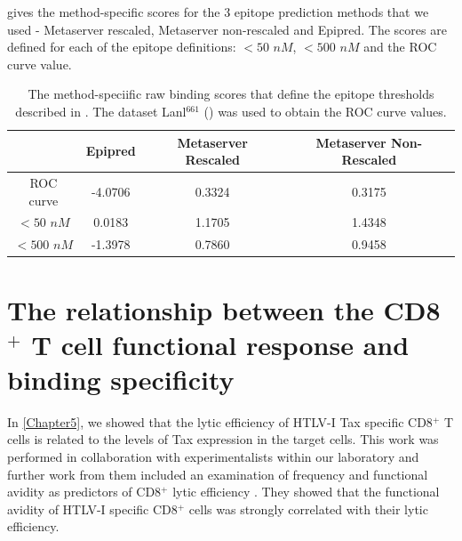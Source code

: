  gives the method-specific scores for the 3 epitope prediction methods that we used - Metaserver rescaled, Metaserver non-rescaled and Epipred. The scores are defined for each of the epitope definitions: $< 50$ $nM$, $< 500$ $nM$ and the ROC curve value.

\begin{table}[htp]
\begin{center}
\begin{tabular}{|c|c|c|c|}
\hline
& Epipred & Metaserver Rescaled & Metaserver Non-Rescaled \bigstrut \\
\hline
ROC curve & -4.0706 & 0.3324 & 0.3175 \bigstrut[t] \\
$< 50$ $nM$ & 0.0183 & 1.1705 & 1.4348 \\
$< 500$ $nM$ & -1.3978 & 0.7860 & 0.9458 \bigstrut[b] \\
\hline
\end{tabular}
\end{center}
\caption[Equivalent cut-off measures across prediction methods]{The method-speciific raw binding scores that define the epitope thresholds described in . The dataset Lanl$^{661}$ () was used to obtain the ROC curve values.}
\label{appendixc/Thresholds}
\end{table}


\section{The relationship between the CD8$^+$ T cell functional response and binding specificity}\label{appendixc/avidRank}

In \cref{Chapter5}, we showed that the lytic efficiency of HTLV-I Tax specific CD8$^+$ T cells is related to the levels of Tax expression in the target cells. This work was performed in collaboration with experimentalists within our laboratory and further work from them included an examination of frequency and functional avidity as predictors of CD8$^+$ lytic efficiency \citep{Kattan2009}. They showed that the functional avidity of HTLV-I specific CD8$^+$ cells was strongly correlated with their lytic efficiency. 

